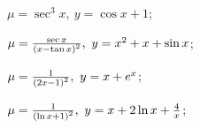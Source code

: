 \begin{enumsols}
		\label{sol:bvp_green:green_linear_hard}
		\item \( \mu = \sec^3{x}, ~ y = \cos{x} + 1 \); %
		\item \( \mu = \frac{\sec{x}}{\left( x - \tan{x} \right)^2}, ~ y = x^2 + x + \sin{x} \); %
		\item \( \mu = \frac{1}{\left( 2x - 1 \right)^2}, ~ y = x + e^{x} \); %
		
		\item \( \mu = \frac{1}{\left( \ln{x} + 1 \right)^2}, ~ y = x + 2 \ln{x} + \frac{4}{x} \); %

	\end{enumsols}


